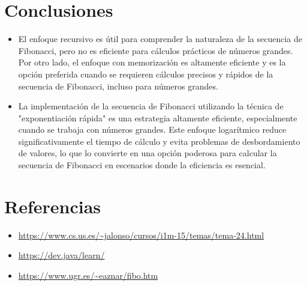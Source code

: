 \documentclass{article}
\begin{document}

    \section{Conclusiones}
        \begin{itemize}
            \item {El enfoque recursivo es útil para comprender la naturaleza de la secuencia de Fibonacci, pero no es eficiente para cálculos prácticos de números grandes. Por otro lado, el enfoque con memorización es altamente eficiente y es la opción preferida cuando se requieren cálculos precisos y rápidos de la secuencia de Fibonacci, incluso para números grandes. }
            \item {La implementación de la secuencia de Fibonacci utilizando la técnica de "exponentiación rápida" es una estrategia altamente eficiente, especialmente cuando se trabaja con números grandes. Este enfoque logarítmico reduce significativamente el tiempo de cálculo y evita problemas de desbordamiento de valores, lo que lo convierte en una opción poderosa para calcular la secuencia de Fibonacci en escenarios donde la eficiencia es esencial.}
        \end{itemize}
        
    \section{Referencias}
    
    \begin{itemize}			
    	\item \url{https://www.cs.us.es/~jalonso/cursos/i1m-15/temas/tema-24.html}
    	\item \url{https://dev.java/learn/}
    	\item \url{https://www.ugr.es/~eaznar/fibo.htm}     
    \end{itemize}	

\end{document}

